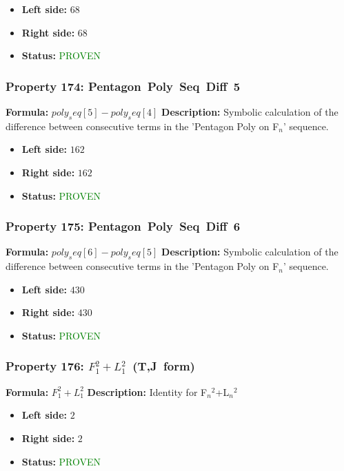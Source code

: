 \begin{itemize}
\item \textbf{Left side:} $68$
\item \textbf{Right side:} $68$
\item \textbf{Status:} \textcolor{green}{PROVEN}
\end{itemize}

\subsubsection*{Property 174: Pentagon~Poly~Seq~Diff~5}
\textbf{Formula:} $poly_seq[5]-poly_seq[4]$
\textbf{Description:} Symbolic calculation of the difference between consecutive terms in the 'Pentagon Poly on F$_n$' sequence.

\begin{itemize}
\item \textbf{Left side:} $162$
\item \textbf{Right side:} $162$
\item \textbf{Status:} \textcolor{green}{PROVEN}
\end{itemize}

\subsubsection*{Property 175: Pentagon~Poly~Seq~Diff~6}
\textbf{Formula:} $poly_seq[6]-poly_seq[5]$
\textbf{Description:} Symbolic calculation of the difference between consecutive terms in the 'Pentagon Poly on F$_n$' sequence.

\begin{itemize}
\item \textbf{Left side:} $430$
\item \textbf{Right side:} $430$
\item \textbf{Status:} \textcolor{green}{PROVEN}
\end{itemize}

\subsubsection*{Property 176: $F_{1}^2+L_{1}^2$~(T,J~form)}
\textbf{Formula:} $F_1^2+L_1^2$
\textbf{Description:} Identity for F$_n$$^2$+L$_n$$^2$

\begin{itemize}
\item \textbf{Left side:} $2$
\item \textbf{Right side:} $2$
\item \textbf{Status:} \textcolor{green}{PROVEN}
\end{itemize}

